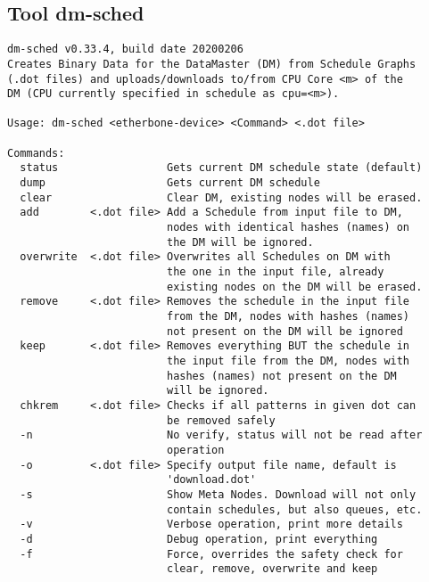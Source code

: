 \subsection{Tool dm-sched}
\label{Tool_dm-sched}
\begin{lstlisting}[style = helptext]
dm-sched v0.33.4, build date 20200206
Creates Binary Data for the DataMaster (DM) from Schedule Graphs
(.dot files) and uploads/downloads to/from CPU Core <m> of the 
DM (CPU currently specified in schedule as cpu=<m>).

Usage: dm-sched <etherbone-device> <Command> <.dot file> 

Commands:
  status                 Gets current DM schedule state (default) 
  dump                   Gets current DM schedule
  clear                  Clear DM, existing nodes will be erased. 
  add        <.dot file> Add a Schedule from input file to DM, 
                         nodes with identical hashes (names) on 
                         the DM will be ignored.
  overwrite  <.dot file> Overwrites all Schedules on DM with 
                         the one in the input file, already 
                         existing nodes on the DM will be erased. 
  remove     <.dot file> Removes the schedule in the input file
                         from the DM, nodes with hashes (names) 
                         not present on the DM will be ignored 
  keep       <.dot file> Removes everything BUT the schedule in
                         the input file from the DM, nodes with
                         hashes (names) not present on the DM 
                         will be ignored.
  chkrem     <.dot file> Checks if all patterns in given dot can 
                         be removed safely
  -n                     No verify, status will not be read after 
                         operation
  -o         <.dot file> Specify output file name, default is 
                         'download.dot'
  -s                     Show Meta Nodes. Download will not only
                         contain schedules, but also queues, etc. 
  -v                     Verbose operation, print more details
  -d                     Debug operation, print everything
  -f                     Force, overrides the safety check for 
                         clear, remove, overwrite and keep
\end{lstlisting}
